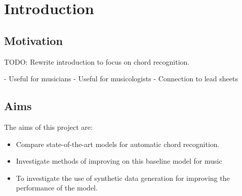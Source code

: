 \chapter{Introduction}

\section{Motivation}




TODO:
Rewrite introduction to focus on chord recognition.

- Useful for musicians
- Useful for musicologists
- Connection to lead sheets

\section{Aims}

The aims of this project are:
\begin{itemize}
    \item Compare state-of-the-art models for automatic chord recognition.
    \item Investigate methods of improving on this baseline model for music 
    \item To investigate the use of synthetic data generation for improving the performance of the model.
\end{itemize}

